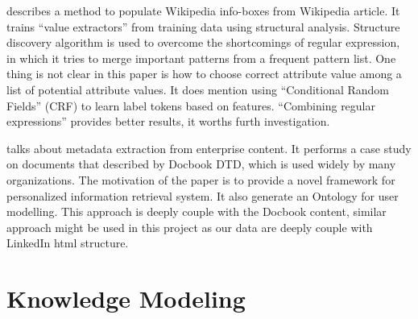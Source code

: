 \begin{enumerate}
\cite{lange2010} describes a method to populate Wikipedia info-boxes from Wikipedia article. It trains ``value extractors'' from training data using structural analysis. Structure discovery algorithm is used to overcome the shortcomings of regular expression, in which it tries to merge important patterns from a frequent pattern list. One thing is not clear in this paper is how to choose correct attribute value among a list of potential attribute values. It does mention using ``Conditional Random Fields'' (CRF) to learn label tokens based on features. ``Combining regular expressions'' provides better results, it worths furth investigation.

\cite{sah2010} talks about metadata extraction from enterprise content. It performs a case study on documents that described by Docbook DTD, which is used widely by many organizations. The motivation of the paper is to provide a novel framework for personalized information retrieval system. It also generate an Ontology for user modelling. This approach is deeply couple with the Docbook content, similar approach might be used in this project as our data are deeply couple with LinkedIn html structure.

\end{enumerate}

\section{Knowledge Modeling}

